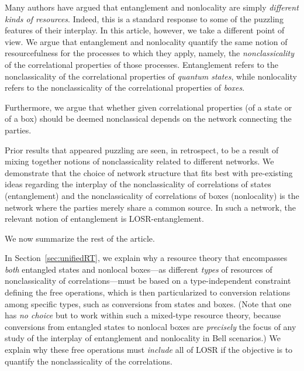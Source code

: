 \documentclass[prx,11pt,letterpaper,twocolumn,accepted=2023-11-27]{quantumarticle}
\theoremstyle{plain}
\theoremstyle{definition}
\begin{document}
  
Many authors have argued that entanglement and nonlocality are simply {\em different kinds of resources}.  Indeed, this is a standard response to some of the puzzling features of their interplay.  
 In this article, however, we take a different point of view. 
We argue that entanglement and nonlocality quantify the same notion of resourcefulness
 for the processes to which they apply, namely, the  {\em nonclassicality} of the correlational properties of those processes.  Entanglement refers to the nonclassicality of the correlational properties of {\em quantum states}, while nonlocality refers to the nonclassicality of the correlational properties of {\em boxes}.

Furthermore, we argue that whether given correlational properties (of a state or of a box) should be deemed nonclassical depends on the network connecting the parties. 

Prior results that appeared puzzling are seen, in retrospect, to be a result of mixing together notions of nonclassicality related to different networks. 
 We demonstrate that the choice of network structure that fits best with pre-existing ideas regarding the interplay of the nonclassicality of correlations of states (entanglement) and the nonclassicality of correlations of boxes (nonlocality) is the network where the parties merely share a common source.  In such a network, the relevant notion of entanglement is LOSR-entanglement. 


We now summarize the rest of the article.   

In Section~\ref{sec:unifiedRT}, we explain why a resource theory that  encompasses {\em both} entangled states and nonlocal boxes---as different {\em types} of resources of nonclassicality of correlations---must be based on a type-independent constraint defining the free operations, which is then particularized to conversion relations among specific types, such as conversions from states and boxes. 
  (Note that one has {\em no choice} but to work within such a  mixed-type resource theory,  because conversions from entangled states to nonlocal boxes are {\em precisely} the focus of any study of the interplay of entanglement and nonlocality in Bell scenarios.)   
We explain why these free operations must {\em include} all of LOSR if the objective is to quantify the nonclassicality of the correlations. 
\end{document}
